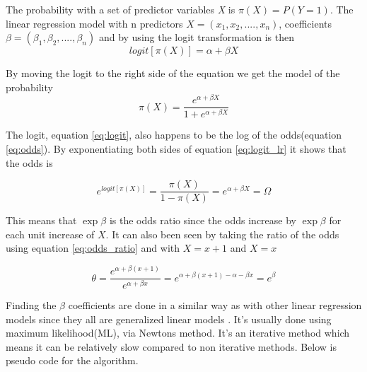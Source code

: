 \documentclass[10pt,a4paper]{report}
\begin{document}

The probability with a set of predictor variables \emph{X} is $\pi(X)=P(Y=1)$. The linear regression model with n predictors $X=(x_1,x_2,....,x_n)$, coefficients $\beta=(\beta_1, \beta_2,....,\beta_n)$ and by using the logit transformation is then\cite{agresti_categorical}
\begin{equation}\label{eq:logit_lr}
logit[\pi(X)]=\alpha+\beta X
\end{equation}

By moving the logit to the right side of the equation we get the model of the probability\cite{agresti_categorical}
\begin{equation}
\pi(X)=\frac{e^{\alpha+\beta X}}{1+e^{\alpha+\beta X}}
\end{equation}

The logit, equation \ref{eq:logit}, also happens to be the log of the odds(equation \ref{eq:odds})\cite{agresti_categorical}. By exponentiating both sides of equation \ref{eq:logit_lr} it shows that the odds is \cite{agresti_categorical}

\begin{equation}
e^{logit[\pi(X)]}=\frac{\pi(X)}{1-\pi(X)}=e^{\alpha+\beta X}=\Omega
\end{equation}

This means that $\exp{\beta}$ is the odds ratio since the odds increase by $\exp{\beta}$ for each unit increase of $X$\cite{agresti_categorical}. It can also been seen by taking the ratio of the odds using equation \ref{eq:odds_ratio} and  with $X=x+1$ and $X=x$

\begin{equation}
\theta=\frac{e^{\alpha+\beta (x+1)}}{e^{\alpha+\beta x}}=e^{\alpha+\beta (x+1)-\alpha-\beta x}=e^{\beta}
\end{equation}

Finding the $\beta$ coefficients are done in a similar way as with other linear regression models since they all are generalized linear models \cite{agresti_categorical}. It's usually done using  maximum likelihood(ML), via Newtons method\cite{agresti_categorical, uvehag_master_thesis}. It's an iterative method which means it can be relatively slow compared to non iterative methods. Below is pseudo code for the algorithm\cite{uvehag_master_thesis}.

\begin{lstlisting}

\end{lstlisting}
\end{document}
